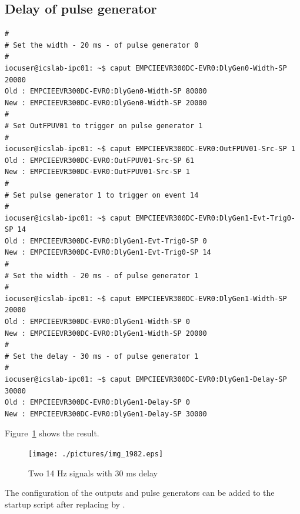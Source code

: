 \documentclass[11pt
  , a4paper
  , article
  , oneside
  , showtrims
]{memoir}
\begin{document}
{\subsection{Delay of pulse generator}
\begin{lstlisting}[style=termstyle]
#
# Set the width - 20 ms - of pulse generator 0
#
iocuser@icslab-ipc01: ~$ caput EMPCIEEVR300DC-EVR0:DlyGen0-Width-SP 20000
Old : EMPCIEEVR300DC-EVR0:DlyGen0-Width-SP 80000
New : EMPCIEEVR300DC-EVR0:DlyGen0-Width-SP 20000
#
# Set OutFPUV01 to trigger on pulse generator 1
#
iocuser@icslab-ipc01: ~$ caput EMPCIEEVR300DC-EVR0:OutFPUV01-Src-SP 1
Old : EMPCIEEVR300DC-EVR0:OutFPUV01-Src-SP 61
New : EMPCIEEVR300DC-EVR0:OutFPUV01-Src-SP 1
#
# Set pulse generator 1 to trigger on event 14
#
iocuser@icslab-ipc01: ~$ caput EMPCIEEVR300DC-EVR0:DlyGen1-Evt-Trig0-SP 14
Old : EMPCIEEVR300DC-EVR0:DlyGen1-Evt-Trig0-SP 0
New : EMPCIEEVR300DC-EVR0:DlyGen1-Evt-Trig0-SP 14
#
# Set the width - 20 ms - of pulse generator 1
#
iocuser@icslab-ipc01: ~$ caput EMPCIEEVR300DC-EVR0:DlyGen1-Width-SP 20000
Old : EMPCIEEVR300DC-EVR0:DlyGen1-Width-SP 0
New : EMPCIEEVR300DC-EVR0:DlyGen1-Width-SP 20000
#
# Set the delay - 30 ms - of pulse generator 1
#
iocuser@icslab-ipc01: ~$ caput EMPCIEEVR300DC-EVR0:DlyGen1-Delay-SP 30000
Old : EMPCIEEVR300DC-EVR0:DlyGen1-Delay-SP 0
New : EMPCIEEVR300DC-EVR0:DlyGen1-Delay-SP 30000
\end{lstlisting}

Figure~\ref{fig:delay} shows the result.\\

\begin{figure}[!htb]
  \centering
    \texttt{[image: ./pictures/img\_1982.eps]}
  \caption{Two 14 Hz signals with 30 ms delay}
  \label{fig:delay}
\end{figure}

The configuration of the outputs and pulse generators can be added to the startup script after  replacing  by .\\


}
\end{document}
